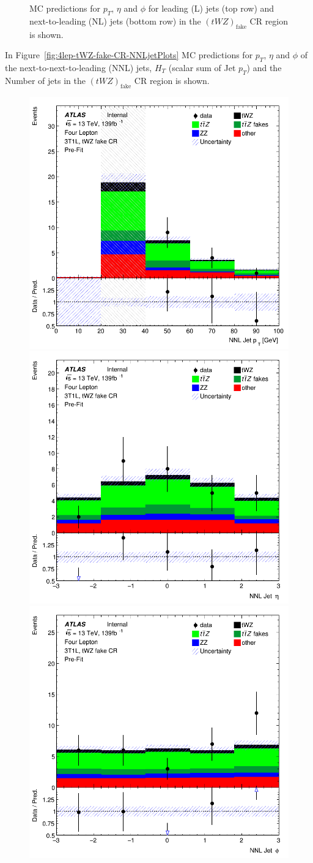 \begin{figure}[htbp]
\begin{tabular}{ccc}
  \end{tabular}
    \caption{MC predictions for $p_{T}$, $\eta$ and $\phi$ for leading (L) jets (top row) and next-to-leading (NL) jets (bottom row) in the $(tWZ)_{\text{fake}}$ CR region  is shown.}
    \label{fig:4lep-tWZ-fake-CR-LandNjetPlots} 
\end{figure}

In Figure~\ref{fig:4lep-tWZ-fake-CR-NNLjetPlots} MC predictions for $p_{T}$, $\eta$ and $\phi$ of the next-to-next-to-leading (NNL) jets, $H_{T}$ (scalar sum of Jet $p_{T}$) and the Number of jets in the $(tWZ)_{\text{fake}}$ CR region is shown.


\begin{figure}[htbp]
 \centering


    \includegraphics[width=.3\textwidth]{figures/PreFitPlots/lep4_tWZ_3T1L_NNLJet_pt.png} \quad
    \includegraphics[width=.3\textwidth]{figures/PreFitPlots/lep4_tWZ_3T1L_NNLJet_eta.png} \quad
    \includegraphics[width=.3\textwidth]{figures/PreFitPlots/lep4_tWZ_3T1L_NNLJet_phi.png}

    \medskip


\end{figure}
